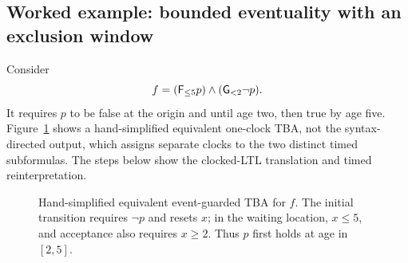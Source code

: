 \subsection{Worked example: bounded eventuality with an exclusion window}
\label{subsec:worked-translation}
Consider
\[
  f=(\mathsf{F}_{\le5}p)\land(\mathsf{G}_{<2}\neg p).
\]
It requires $p$ to be false at the origin and until age two, then true by age
five. Figure~\ref{fig:translation-reference-tba} shows a hand-simplified
equivalent one-clock TBA, not the syntax-directed output, which assigns
separate clocks to the two distinct timed subformulas. The steps below show
the clocked-LTL translation and timed reinterpretation.

\begin{figure}[t]
\centering
\resizebox{0.88\columnwidth}{!}{}
\caption{Hand-simplified equivalent event-guarded TBA for $f$. The initial
transition requires $\neg p$ and resets $x$; in the waiting location,
$x\le5$, and acceptance also requires $x\ge2$. Thus $p$ first holds at age
in $[2,5]$.}
\label{fig:translation-reference-tba}
\end{figure}

